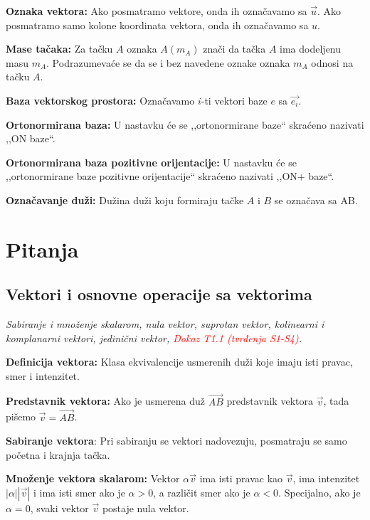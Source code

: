 \documentclass[12pt]{article}
\newcommand{\vek}[1]{\overrightarrow{#1}}
\newcommand{\ocena}[1]{\textcolor{red}{#1}}
\begin{document}
\textbf{Oznaka vektora:} Ako posmatramo vektore, onda ih označavamo sa
$\vek{u}$. Ako posmatramo samo kolone koordinata vektora, onda ih označavamo sa
$u$.
\par

\textbf{Mase tačaka:} Za tačku $A$ oznaka $A(m_A)$ znači da tačka $A$ ima
dodeljenu masu $m_A$. Podrazumevaće se da se i bez navedene oznake oznaka
$m_{A}$ odnosi na tačku $A$.
\par

\textbf{Baza vektorskog prostora:} Označavamo $i$-ti vektori baze $e$ sa
$\vek{e_i}$.
\par

\textbf{Ortonormirana baza:} U nastavku će se ,,ortonormirane baze`` skraćeno
nazivati ,,ON baze``.
\par

\textbf{Ortonormirana baza pozitivne orijentacije:} U nastavku će se
,,ortonormirane baze pozitivne orijentacije`` skraćeno nazivati ,,ON+ baze``.
\par

\textbf{Označavanje duži:} Dužina duži koju formiraju tačke $A$ i $B$
se označava sa AB.

\newpage

\section{Pitanja}
\subsection{Vektori i osnovne operacije sa vektorima}
\textit{Sabiranje i množenje skalarom, nula vektor, suprotan vektor, kolinearni
    i komplanarni vektori, jedinični vektor, \ocena{Dokaz T1.1 (tvrđenja S1-S4)}.}
\par
\vspace*{1cm}

\textbf{Definicija vektora:} Klasa ekvivalencije usmerenih duži koje imaju isti
pravac, smer i intenzitet.
\par

\textbf{Predstavnik vektora:} Ako je usmerena duž $\vek{AB}$ predstavnik vektora
$\vek{v}$, tada pišemo $\vek{v}=\vek{AB}$.
\par

\textbf{Sabiranje vektora}: Pri sabiranju se vektori nadovezuju, posmatraju se
samo početna i krajnja tačka.
\par

\textbf{Množenje vektora skalarom:} Vektor $\alpha\vek{v}$ ima isti pravac
kao $\vek{v}$, ima intenzitet $|\alpha||\vek{v}|$ i ima isti smer ako je
$\alpha>0$, a različit smer ako je $\alpha<0$. Specijalno, ako je $\alpha=0$,
svaki vektor $\vek{v}$ postaje nula vektor.
\par
\end{document}
